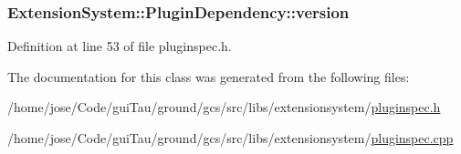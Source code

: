 \hypertarget{struct_extension_system_1_1_plugin_dependency_a2d00bf5564134af5cb2eeddf2074eee8}{
\subsubsection[{version}]{ Extension\-System\-::\-Plugin\-Dependency\-::version}}\label{struct_extension_system_1_1_plugin_dependency_a2d00bf5564134af5cb2eeddf2074eee8}


Definition at line 53 of file pluginspec.\-h.



The documentation for this class was generated from the following files\-:\begin{DoxyCompactItemize}
\item 
/home/jose/\-Code/gui\-Tau/ground/gcs/src/libs/extensionsystem/\hyperlink{pluginspec_8h}{pluginspec.\-h}\item 
/home/jose/\-Code/gui\-Tau/ground/gcs/src/libs/extensionsystem/\hyperlink{pluginspec_8cpp}{pluginspec.\-cpp}\end{DoxyCompactItemize}
